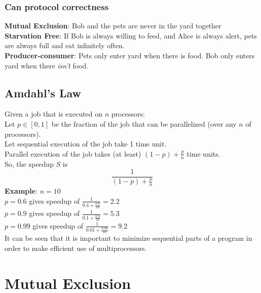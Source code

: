 \documentclass{article}
\begin{document}
\subsubsection{Can protocol correctness}
\textbf{Mutual Exclusion}: Bob and the pets are never in the yard together
\\\textbf{Starvation Free}: If Bob is always willing to feed, and Alice is always alert, pets are always full and eat infinitely often.
\\\textbf{Producer-consumer}: Pets only enter yard when there is food. Bob only enters yard when there \textit{isn't} food.

\subsection{Amdahl's Law}
Given a job that is executed on $n$ processors:
\\Let $p \in [0,1]$ be the fraction of the job that can be parallelized (over any $n$ of processors).
\\Let sequential execution of the job take 1 time unit.
\\Parallel execution of the job takes (at least) $(1-p)+\frac{p}{n}$ time units.
\\So, the speedup $S$ is 
$$\frac{1}{(1-p)+\frac{p}{n}}$$
\textbf{Example}:
$n=10$
\\$p=0.6$ gives speedup of $\frac{1}{0.4 + \frac{0.6}{10}}=2.2$
\\$p=0.9$ gives speedup of $\frac{1}{0.1 + \frac{0.9}{10}}=5.3$
\\$p=0.99$ gives speedup of $\frac{1}{0.01 + \frac{0.99}{10}}=9.2$
\\It can be seen that it is important to minimize sequential parts of a program in order to make efficient use of multiprocessors.






%
%
\section{Mutual Exclusion}
\end{document}
